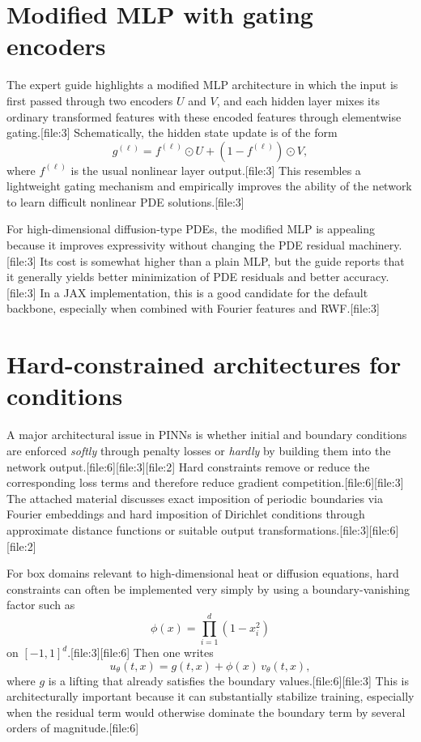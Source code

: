 \documentclass[11pt]{report}
\begin{document}
\section{Modified MLP with gating encoders}

The expert guide highlights a modified MLP architecture in which the input is first passed through two encoders \(U\) and \(V\), and each hidden layer mixes its ordinary transformed features with these encoded features through elementwise gating.[file:3]  
Schematically, the hidden state update is of the form
\[
g^{(\ell)} = f^{(\ell)} \odot U + (1-f^{(\ell)}) \odot V,
\]
where \(f^{(\ell)}\) is the usual nonlinear layer output.[file:3]  
This resembles a lightweight gating mechanism and empirically improves the ability of the network to learn difficult nonlinear PDE solutions.[file:3]

For high-dimensional diffusion-type PDEs, the modified MLP is appealing because it improves expressivity without changing the PDE residual machinery.[file:3]  
Its cost is somewhat higher than a plain MLP, but the guide reports that it generally yields better minimization of PDE residuals and better accuracy.[file:3]  
In a JAX implementation, this is a good candidate for the default backbone, especially when combined with Fourier features and RWF.[file:3]

\section{Hard-constrained architectures for conditions}

A major architectural issue in PINNs is whether initial and boundary conditions are enforced \emph{softly} through penalty losses or \emph{hardly} by building them into the network output.[file:6][file:3][file:2]  
Hard constraints remove or reduce the corresponding loss terms and therefore reduce gradient competition.[file:6][file:3]  
The attached material discusses exact imposition of periodic boundaries via Fourier embeddings and hard imposition of Dirichlet conditions through approximate distance functions or suitable output transformations.[file:3][file:6][file:2]

For box domains relevant to high-dimensional heat or diffusion equations, hard constraints can often be implemented very simply by using a boundary-vanishing factor such as
\[
\phi(x)=\prod_{i=1}^d (1-x_i^2)
\]
on \([-1,1]^d\).[file:3][file:6]  
Then one writes
\[
u_\theta(t,x)=g(t,x)+\phi(x)\,v_\theta(t,x),
\]
where \(g\) is a lifting that already satisfies the boundary values.[file:6][file:3]  
This is architecturally important because it can substantially stabilize training, especially when the residual term would otherwise dominate the boundary term by several orders of magnitude.[file:6]
\end{document}
